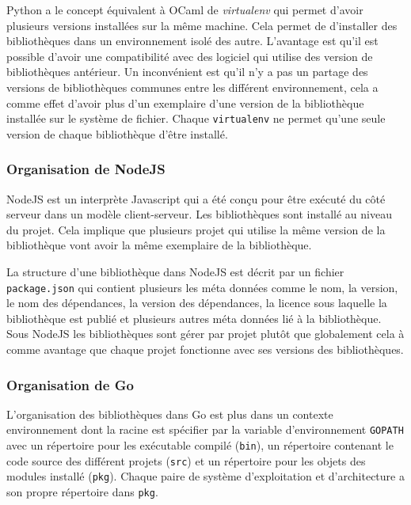Python a le concept équivalent à OCaml de \textit{virtualenv} qui permet d'avoir plusieurs
versions installées sur la même machine. Cela permet de d'installer des
bibliothèques dans un environnement isolé des autre. L'avantage est qu'il est
possible d'avoir une compatibilité avec des logiciel qui utilise des version de
bibliothèques antérieur. Un inconvénient est qu'il n'y a pas un partage des
versions de bibliothèques communes entre les différent environnement, cela a
comme effet d'avoir plus d'un exemplaire d'une version de la bibliothèque installée
sur le système de fichier. Chaque \texttt{virtualenv} ne permet qu'une seule version de
chaque bibliothèque d'être installé.


\subsubsection{Organisation de NodeJS}
NodeJS est un interprète Javascript qui a été conçu pour être exécuté
du côté serveur dans un modèle client-serveur. Les bibliothèques sont
installé au niveau du projet. Cela implique que plusieurs projet qui
utilise la même version de la bibliothèque vont avoir la même exemplaire
de la bibliothèque.

La structure d'une bibliothèque dans NodeJS est décrit par un fichier
\texttt{package.json} qui contient plusieurs les méta données comme
le nom, la version, le nom des dépendances, la version des dépendances,
la licence sous laquelle la bibliothèque est publié et plusieurs autres
méta données lié à la bibliothèque. Sous NodeJS les bibliothèques sont gérer
par projet plutôt que globalement cela à comme avantage que chaque projet
fonctionne avec ses versions des bibliothèques.

\subsubsection{Organisation de Go}
L'organisation des bibliothèques dans Go est plus dans un
contexte environnement dont la racine est spécifier par la variable d'environnement \texttt{GOPATH}
avec un répertoire pour les exécutable compilé (\texttt{bin}),
un répertoire contenant le code source des différent projets (\texttt{src}) et un
répertoire pour les objets des modules installé (\texttt{pkg}). Chaque paire de système
d'exploitation et d'architecture a son propre répertoire dans \texttt{pkg}.

